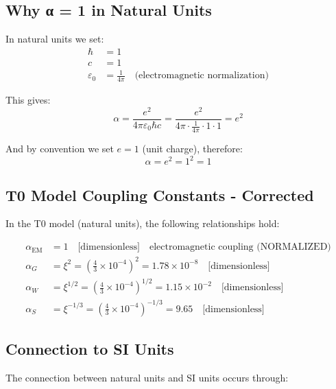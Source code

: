 \documentclass[12pt,a4paper]{report}
\begin{document}
\subsection{Why α = 1 in Natural Units}
\label{subsec:why_alpha_equals_one}

In natural units we set:
\begin{align}
	\hbar &= 1 \\
	c &= 1 \\
	\varepsilon_0 &= \frac{1}{4\pi} \quad \text{(electromagnetic normalization)}
\end{align}

This gives:
\begin{equation}
	\alpha = \frac{e^2}{4\pi\varepsilon_0\hbar c} = \frac{e^2}{4\pi \cdot \frac{1}{4\pi} \cdot 1 \cdot 1} = e^2
\end{equation}

And by convention we set $e = 1$ (unit charge), therefore:
\begin{equation}
	\boxed{\alpha = e^2 = 1^2 = 1}
\end{equation}

\subsection{T0 Model Coupling Constants - Corrected}
\label{subsec:t0_coupling_corrected}

In the T0 model (natural units), the following relationships hold:

\begin{align}
	\alpha_{\text{EM}} &= 1 \quad \text{[dimensionless]} \quad \text{electromagnetic coupling (NORMALIZED)} \\
	\alpha_G &= \xi^2 = \left(\frac{4}{3} \times 10^{-4}\right)^2 = 1.78 \times 10^{-8} \quad \text{[dimensionless]} \\
	\alpha_W &= \xi^{1/2} = \left(\frac{4}{3} \times 10^{-4}\right)^{1/2} = 1.15 \times 10^{-2} \quad \text{[dimensionless]} \\
	\alpha_S &= \xi^{-1/3} = \left(\frac{4}{3} \times 10^{-4}\right)^{-1/3} = 9.65 \quad \text{[dimensionless]}
\end{align}

\subsection{Connection to SI Units}
\label{subsec:connection_to_si}

The connection between natural units and SI units occurs through:
\end{document}
